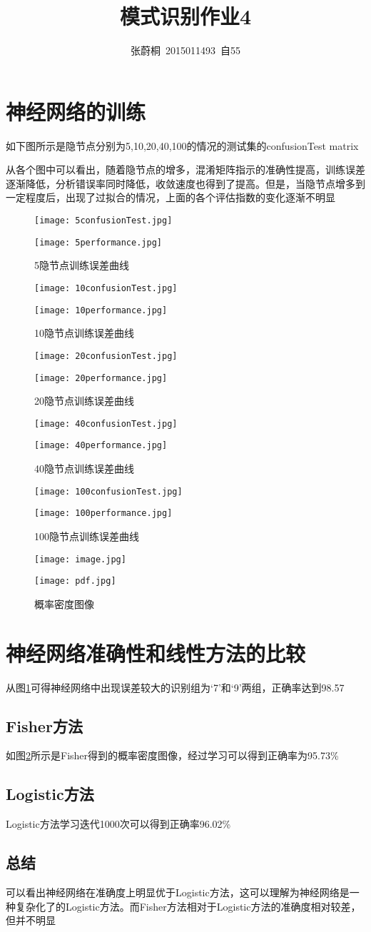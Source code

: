 \documentclass[UTF8,a4paper]{ctexart}
\title{模式识别作业4}
\author{张蔚桐\ 2015011493\ 自55}
\begin{document}
\maketitle
\section{神经网络的训练}
如下图所示是隐节点分别为5,10,20,40,100的情况的测试集的confusionTest matrix

从各个图中可以看出，随着隐节点的增多，混淆矩阵指示的准确性提高，训练误差逐渐降低，分析错误率同时降低，收敛速度也得到了提高。但是，当隐节点增多到一定程度后，出现了过拟合的情况，上面的各个评估指数的变化逐渐不明显

\begin{figure}
\texttt{[image: 5confusionTest.jpg]}
\caption{5隐节点测试集混淆矩阵}
\texttt{[image: 5performance.jpg]}
\caption{5隐节点训练误差曲线}
\end{figure}
\begin{figure}
\texttt{[image: 10confusionTest.jpg]}
\caption{10隐节点测试集混淆矩阵}
\texttt{[image: 10performance.jpg]}
\caption{10隐节点训练误差曲线}
\end{figure}
\begin{figure}
\texttt{[image: 20confusionTest.jpg]}
\caption{20隐节点测试集混淆矩阵}
\texttt{[image: 20performance.jpg]}
\caption{20隐节点训练误差曲线}
\end{figure}
\begin{figure}
\texttt{[image: 40confusionTest.jpg]}
\caption{40隐节点测试集混淆矩阵}
\texttt{[image: 40performance.jpg]}
\caption{40隐节点训练误差曲线}
\end{figure}
\begin{figure}
\texttt{[image: 100confusionTest.jpg]}
\caption{100隐节点测试集混淆矩阵}
\label{confusion}
\texttt{[image: 100performance.jpg]}
\caption{100隐节点训练误差曲线}
\end{figure}
\begin{figure}
\texttt{[image: image.jpg]}
\caption{训练集中的图像}
\texttt{[image: pdf.jpg]}
\caption{概率密度图像}
\label{pdf}
\end{figure}
\clearpage
\section{神经网络准确性和线性方法的比较}
从图\ref{confusion}可得神经网络中出现误差较大的识别组为‘7’和‘9’两组，正确率达到98.57%
\subsection{Fisher方法}
如图\ref{pdf}所示是Fisher得到的概率密度图像，经过学习可以得到正确率为95.73\%
\subsection{Logistic方法}
Logistic方法学习迭代1000次可以得到正确率96.02\%
\subsection{总结}
可以看出神经网络在准确度上明显优于Logistic方法，这可以理解为神经网络是一种复杂化了的Logistic方法。而Fisher方法相对于Logistic方法的准确度相对较差，但并不明显
\end{document}
